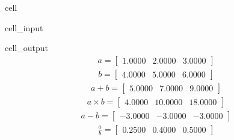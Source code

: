\documentclass[letterpaper,10pt,english]{jupyterBook}
\begin{document}
\begin{sphinxuseclass}{cell}
\begin{sphinxVerbatimInput}
\begin{sphinxuseclass}{cell_input}
\end{sphinxuseclass}\end{sphinxVerbatimInput}
\begin{sphinxVerbatimOutput}

\begin{sphinxuseclass}{cell_output}\begin{equation*}
\begin{split}\displaystyle a=\left[
\begin{array}{}
  1.0000 &  2.0000 &  3.0000
\end{array}
\right]\end{split}
\end{equation*}\begin{equation*}
\begin{split}\displaystyle b=\left[
\begin{array}{}
  4.0000 &  5.0000 &  6.0000
\end{array}
\right]\end{split}
\end{equation*}\begin{equation*}
\begin{split}\displaystyle a + b =\left[
\begin{array}{}
  5.0000 &  7.0000 &  9.0000
\end{array}
\right]\end{split}
\end{equation*}\begin{equation*}
\begin{split}\displaystyle a \times b =\left[
\begin{array}{}
  4.0000 &  10.0000 &  18.0000
\end{array}
\right]\end{split}
\end{equation*}\begin{equation*}
\begin{split}\displaystyle a - b =\left[
\begin{array}{}
 -3.0000 & -3.0000 & -3.0000
\end{array}
\right]\end{split}
\end{equation*}\begin{equation*}
\begin{split}\displaystyle \frac{a}{b} =\left[
\begin{array}{}
  0.2500 &  0.4000 &  0.5000
\end{array}
\right]\end{split}
\end{equation*}
\end{sphinxuseclass}\end{sphinxVerbatimOutput}

\end{sphinxuseclass}
\end{document}
